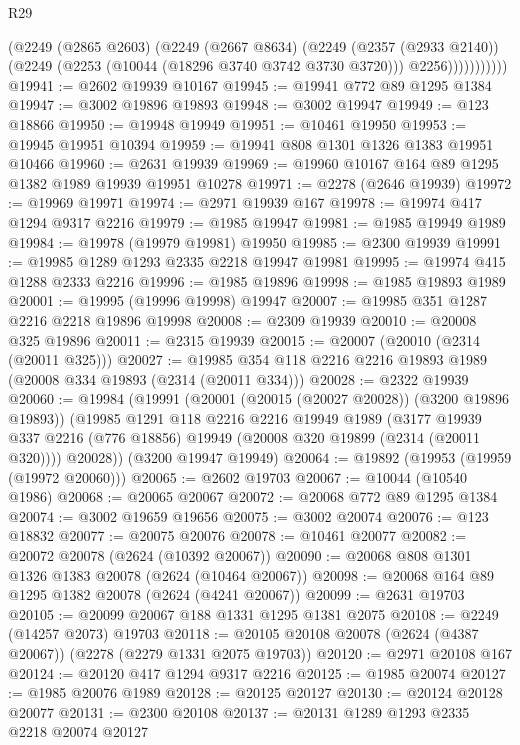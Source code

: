 \begin{lexlean}{R29}
\begin{coremodule}
                  (@2249
                    (@2865 @2603)
                    (@2249
                      (@2667 @8634)
                      (@2249
                        (@2357 (@2933 @2140))
                        (@2249 (@2253 (@10044 (@18296 @3740 @3742 @3730 @3720))) @2256)))))))))))
@19941 := @2602 @19939 @10167
@19945 := @19941 @772 @89 @1295 @1384
@19947 := @3002 @19896 @19893
@19948 := @3002 @19947
@19949 := @123 @18866
@19950 := @19948 @19949
@19951 := @10461 @19950
@19953 := @19945 @19951 @10394
@19959 := @19941 @808 @1301 @1326 @1383 @19951 @10466
@19960 := @2631 @19939
@19969 := @19960 @10167 @164 @89 @1295 @1382 @1989 @19939 @19951 @10278
@19971 := @2278 (@2646 @19939)
@19972 := @19969 @19971
@19974 := @2971 @19939 @167
@19978 := @19974 @417 @1294 @9317 @2216
@19979 := @1985 @19947
@19981 := @1985 @19949 @1989
@19984 := @19978 (@19979 @19981) @19950
@19985 := @2300 @19939
@19991 := @19985 @1289 @1293 @2335 @2218 @19947 @19981
@19995 := @19974 @415 @1288 @2333 @2216
@19996 := @1985 @19896
@19998 := @1985 @19893 @1989
@20001 := @19995 (@19996 @19998) @19947
@20007 := @19985 @351 @1287 @2216 @2218 @19896 @19998
@20008 := @2309 @19939
@20010 := @20008 @325 @19896
@20011 := @2315 @19939
@20015 := @20007 (@20010 (@2314 (@20011 @325)))
@20027 := @19985 @354 @118 @2216 @2216 @19893 @1989 (@20008 @334 @19893 (@2314 (@20011 @334)))
@20028 := @2322 @19939
@20060 := @19984
    (@19991
      (@20001 (@20015 (@20027 @20028)) (@3200 @19896 @19893))
      (@19985
        @1291
        @118
        @2216
        @2216
        @19949
        @1989
        (@3177 @19939 @337 @2216 (@776 @18856) @19949 (@20008 @320 @19899 (@2314 (@20011 @320))))
        @20028))
    (@3200 @19947 @19949)
@20064 := @19892 (@19953 (@19959 (@19972 @20060)))
@20065 := @2602 @19703
@20067 := @10044 (@10540 @1986)
@20068 := @20065 @20067
@20072 := @20068 @772 @89 @1295 @1384
@20074 := @3002 @19659 @19656
@20075 := @3002 @20074
@20076 := @123 @18832
@20077 := @20075 @20076
@20078 := @10461 @20077
@20082 := @20072 @20078 (@2624 (@10392 @20067))
@20090 := @20068 @808 @1301 @1326 @1383 @20078 (@2624 (@10464 @20067))
@20098 := @20068 @164 @89 @1295 @1382 @20078 (@2624 (@4241 @20067))
@20099 := @2631 @19703
@20105 := @20099 @20067 @188 @1331 @1295 @1381 @2075
@20108 := @2249 (@14257 @2073) @19703
@20118 := @20105 @20108 @20078 (@2624 (@4387 @20067)) (@2278 (@2279 @1331 @2075 @19703))
@20120 := @2971 @20108 @167
@20124 := @20120 @417 @1294 @9317 @2216
@20125 := @1985 @20074
@20127 := @1985 @20076 @1989
@20128 := @20125 @20127
@20130 := @20124 @20128 @20077
@20131 := @2300 @20108
@20137 := @20131 @1289 @1293 @2335 @2218 @20074 @20127

\end{coremodule}
\end{lexlean}
